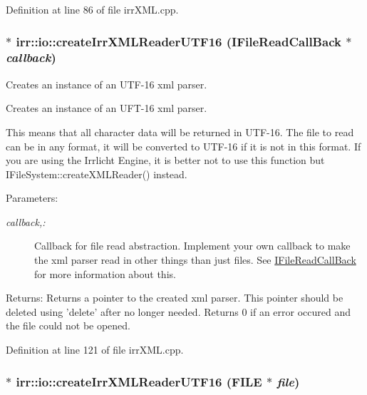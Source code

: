 Definition at line 86 of file irrXML.cpp.\hypertarget{namespaceirr_1_1io_22f1e46e541bcdbe778ce89c37ee9743}{
\subsubsection[{createIrrXMLReaderUTF16}]{ $\ast$ irr::io::createIrrXMLReaderUTF16 (IFileReadCallBack $\ast$ {\em callback})}}
\label{namespaceirr_1_1io_22f1e46e541bcdbe778ce89c37ee9743}


Creates an instance of an UTF-16 xml parser. 

Creates an instance of an UFT-16 xml parser.

This means that all character data will be returned in UTF-16. The file to read can be in any format, it will be converted to UTF-16 if it is not in this format. If you are using the Irrlicht Engine, it is better not to use this function but IFileSystem::createXMLReader() instead. \begin{Desc}
\item[Parameters:]
\begin{description}
\item[{\em callback,:}]Callback for file read abstraction. Implement your own callback to make the xml parser read in other things than just files. See \hyperlink{classirr_1_1io_1_1_i_file_read_call_back}{IFileReadCallBack} for more information about this. \end{description}
\end{Desc}
\begin{Desc}
\item[Returns:]Returns a pointer to the created xml parser. This pointer should be deleted using 'delete' after no longer needed. Returns 0 if an error occured and the file could not be opened. \end{Desc}


Definition at line 121 of file irrXML.cpp.\hypertarget{namespaceirr_1_1io_4cc6190dd7eab54b7bff7219c550627f}{
\subsubsection[{createIrrXMLReaderUTF16}]{ $\ast$ irr::io::createIrrXMLReaderUTF16 (FILE $\ast$ {\em file})}}
\label{namespaceirr_1_1io_4cc6190dd7eab54b7bff7219c550627f}


